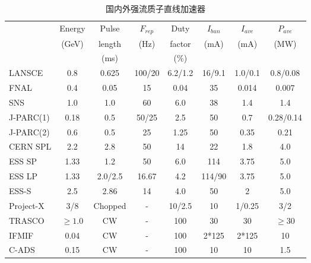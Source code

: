 \begin{table}[!htb]
  \centering
  \begin{tabular}{|>{\small}l|c|c|c|c|c|c|c|}
    \hline
                &Energy &Pulse   &$F_{rep}$ &Duty     &$I_{bun}$ &$I_{ave}$ &$P_{ave}$ \\
                &(GeV)  &length  &(Hz)      &factor   &(mA)      &(mA)      &(MW)      \\
                &       &(ms)    &          &(\%)     &          &          &          \\
    \hline
    LANSCE      &0.8   &0.625    &100/20    &6.2/1.2  &16/9.1    &1.0/0.1   &0.8/0.08  \\
    FNAL        &0.4   &0.05     &15        &0.04     &35        &0.014     &0.007     \\
    SNS         &1.0   &1.0      &60        &6.0      &38        &1.4       &1.4       \\
    J-PARC(1)   &0.18  &0.5      &50/25     &2.5      &50        &0.7       &0.28/0.14 \\
    J-PARC(2)   &0.6   &0.5      &25        &1.25     &50        &0.35      &0.21      \\
    CERN SPL    &2.2   &2.8      &50        &14       &22        &1.8       &4.0       \\
    ESS SP      &1.33  &1.2      &50        &6.0      &114       &3.75      &5.0       \\
    ESS LP      &1.33  &2.0/2.5  &16.67     &4.2      &114/90    &3.75      &5.0       \\
    ESS-S       &2.5   &2.86     &14        &4.0      &50        &2         &5.0       \\
    Project-X   &3/8   &Chopped  &-         &10/2.5   &10        &1/0.25    &3/2       \\
    TRASCO      &$\geqslant 1.0$ &CW  &-      &100      &30        &30        &$\geqslant 30$ \\
    IFMIF       &0.04  &CW       &-         &100      &2*125     &2*125     &10        \\
    C-ADS       &0.15  &CW       &-         &100      &10        &10        &1.5       \\
    \hline
  \end{tabular}
  \caption{国内外强流质子直线加速器}
  \label{tab:proton_linac}
\end{table}


